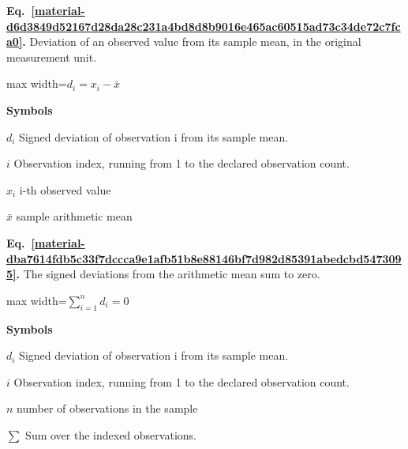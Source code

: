\documentclass[11pt,a4paper]{article}
\begin{document}
\par\medskip
\noindent\begin{minipage}{\linewidth}
\label{material-d6d3849d52167d28da28c231a4bd8d8b9016e465ac60515ad73c34de72c7fca0}
\noindent\textbf{Eq.~\ref*{material-d6d3849d52167d28da28c231a4bd8d8b9016e465ac60515ad73c34de72c7fca0}.} Deviation of an observed value from its sample mean, in the original measurement unit.\par\nopagebreak
\begin{center}\begin{adjustbox}{max width=\linewidth}$\displaystyle d_i=x_i-\bar{x}$\end{adjustbox}\end{center}

\par\noindent\textbf{Symbols}

\par\noindent\textbf{\(d_i\)} Signed deviation of observation i from its sample mean.

\par\noindent\textbf{\(i\)} Observation index, running from 1 to the declared observation count.

\par\noindent\textbf{\(x_i\)} i-th observed value

\par\noindent\textbf{\(\bar{x}\)} sample arithmetic mean

\end{minipage}\par
\medskip

\par\medskip
\noindent\begin{minipage}{\linewidth}
\label{material-dba7614fdb5c33f7dccca9e1afb51b8e88146bf7d982d85391abedcbd5473095}
\noindent\textbf{Eq.~\ref*{material-dba7614fdb5c33f7dccca9e1afb51b8e88146bf7d982d85391abedcbd5473095}.} The signed deviations from the arithmetic mean sum to zero.\par\nopagebreak
\begin{center}\begin{adjustbox}{max width=\linewidth}$\displaystyle \sum_{i=1}^n d_i=0$\end{adjustbox}\end{center}

\par\noindent\textbf{Symbols}

\par\noindent\textbf{\(d_i\)} Signed deviation of observation i from its sample mean.

\par\noindent\textbf{\(i\)} Observation index, running from 1 to the declared observation count.

\par\noindent\textbf{\(n\)} number of observations in the sample

\par\noindent\textbf{\(\sum\)} Sum over the indexed observations.

\end{minipage}\par
\medskip
\end{document}
